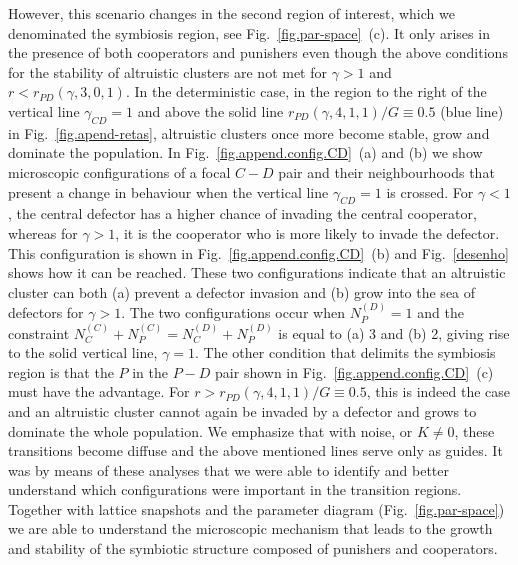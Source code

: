 \documentclass[5p]{elsarticle}
\def\NCC{N^{{\scriptscriptstyle(C)}}_{C}}
\def\NCP{N^{{\scriptscriptstyle(C)}}_{P}}
\def\NDP{N^{{\scriptscriptstyle(D)}}_{P}}
\def\NDC{N^{{\scriptscriptstyle(D)}}_{C}}
\begin{document}
However, this scenario changes in the second region of interest, which we denominated the symbiosis region, see Fig.~\ref{fig.par-space}~(c). It only arises in the presence of both cooperators and punishers even though the above conditions for the stability of altruistic  clusters are not met for $\gamma>1$ and  $ r < r_{PD}(\gamma,3,0,1)$. In the deterministic case, in the region to the right of the vertical line $\gamma_{CD} = 1$  and above the solid line $r_{PD}(\gamma, 4, 1, 1)/G\equiv 0.5$ (blue line) in Fig.~\ref{fig.apend-retas},  altruistic clusters once more become stable, grow and dominate the population. In Fig.~\ref{fig.append.config.CD}~(a) and (b) we show microscopic configurations of a focal $C-D$ pair and their neighbourhoods that present a change in behaviour when the vertical line $\gamma_{CD} = 1$ is crossed. For $\gamma < 1$, the central defector has a higher chance of invading the central cooperator, whereas for $\gamma > 1$, it is the cooperator who is more likely to invade the defector. This configuration is shown in Fig.~\ref{fig.append.config.CD}~(b) and Fig.~\ref{desenho} shows how it can be reached. These two configurations indicate that an altruistic cluster can both (a) prevent a defector invasion and  (b) grow into the sea of defectors for $\gamma>1$.  The two configurations occur when $\NDP = 1$ and the constraint $\NCC+\NCP = \NDC+\NDP$ is equal to (a) 3 and (b) 2,  giving rise to the solid vertical line, $\gamma=1$. 
The other condition that delimits the symbiosis region is that the $P$ in the $P-D$ pair shown in Fig.~\ref{fig.append.config.CD}~(c) must have the advantage. For $r> r_{PD}(\gamma, 4, 1, 1)/G\equiv 0.5$, this is indeed the case and an altruistic cluster cannot again be invaded by a defector and grows to dominate the whole population. We emphasize that with noise, or $K\neq 0$, these transitions become diffuse and the above mentioned lines serve only as guides. 
%
It was by means of these analyses that we were able to identify and better understand which configurations were important in the transition regions. Together with lattice snapshots and the parameter diagram (Fig.~\ref{fig.par-space}) we are able to  understand the microscopic mechanism that leads to the growth and stability of the symbiotic structure composed of punishers and cooperators.
%
\end{document}
